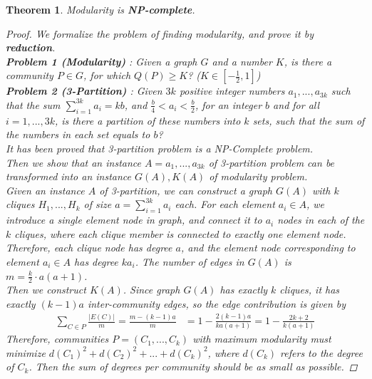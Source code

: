 \documentclass[11pt]{article}
\newtheorem{theorem}{Theorem}
\begin{document}
\begin{theorem}
  Modularity is \textbf{NP-complete}.\cite{brandes2007modularity}
  \begin{proof}
    We formalize the problem of finding modularity, and prove it by \textbf{reduction}.
    \\ \textbf{Problem 1 (Modularity) }: Given a graph $G$ and a number $K$, is there a community $P\in G$, for which $Q(P)\ge K$? ($K\in [-\frac{1}{2},1]$)
    \\ \textbf{Problem 2 (3-Partition) }: Given $3k$ positive integer numbers $a_1,...,a_{3k}$ such that the sum $\sum_{i=1}^{3k}a_i=kb$, and $\frac{b}{4} < a_i < \frac{b}{2}$, for an integer $b$ and for all $i=1,...,3k$,
    is there a partition of these numbers into $k$ sets, such that the sum of the numbers in each set equals to $b$?
    \\ It has been proved that 3-partition problem is a NP-Complete problem.\cite{provenp}
    \\ Then we show that an instance $A={a_1,...,a_{3k}}$ of 3-partition problem can be transformed into an instance $G(A), K(A)$ of modularity problem.
    \\ Given an instance $A$ of 3-partition, we can construct a graph $G(A)$ with $k$ cliques $H_1,...,H_k$ of size $a=\sum_{i=1}^{3k} a_i$ each. For each element $a_i\in A$, we introduce a single element node in graph, and 
    connect it to $a_i$ nodes in each of the $k$ cliques, where each clique member is connected to exactly one element node. Therefore, each clique node has degree $a$, and the element node corresponding to element $a_i\in A$ has degree
    $ka_i$. The number of edges in $G(A)$ is $m=\frac{k}{2}·a(a+1)$.
    \\ Then we construct $K(A)$. Since graph $G(A)$ has exactly $k$ cliques, it has exactly $(k-1)a$ inter-community edges, so the edge contribution is given by
    \begin{equation}
      \begin{split}
      \sum_{C\in P}\frac{|E(C)|}{m}=\frac{m-(k-1)a}{m}
      \end{split}
      \begin{split}
      =1-\frac{2(k-1)a}{ka(a+1)}=1-\frac{2k+2}{k(a+1)}
      \end{split}
    \end{equation}
    Therefore, communities $P=(C_1,...,C_k)$ with maximum modularity must minimize $d(C_1)^2+d(C_2)^2+...+d(C_k)^2$, where $d(C_k)$ refers to the degree of $C_k$. Then the sum of degrees per community should be as small as possible.

\end{proof}
\end{theorem}
\end{document}
